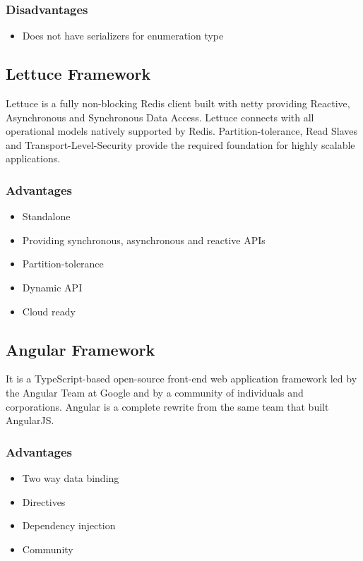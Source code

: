 \documentclass[a4paper, hidelinks, 12pt]{report}
\begin{document}
\subsubsection{Disadvantages}
			\begin{itemize}
		\item{} Does not have serializers for enumeration type
		\end{itemize}
		
\subsection{Lettuce Framework} Lettuce is a fully non-blocking Redis client built with netty providing Reactive, Asynchronous and Synchronous Data Access. Lettuce connects with all operational models natively supported by Redis. Partition-tolerance, Read Slaves and Transport-Level-Security provide the required foundation for highly scalable applications.
\subsubsection{Advantages}
\begin{itemize}
\item{} Standalone
\item{} Providing synchronous, asynchronous and reactive APIs
\item{} Partition-tolerance
\item{} Dynamic API
\item{} Cloud ready
\end{itemize}


\subsection{Angular Framework} It is a TypeScript-based open-source front-end web application framework led by the Angular Team at Google and by a community of individuals and corporations. Angular is a complete rewrite from the same team that built AngularJS.
\subsubsection{Advantages}
\begin{itemize}
\item{} Two way data binding
\item{} Directives
\item{} Dependency injection
\item{} Community
\end{itemize}
\end{document}
